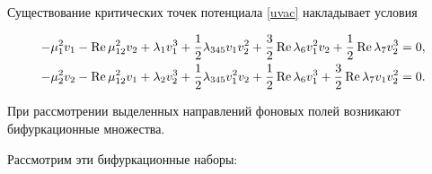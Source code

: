 Существование критических точек потенциала \eqref{uvac} накладывает условия

\begin{gather}

\label{dudv1}

-\mu_1^2 v_1- \mathop{\rm Re} \mu_{12}^2 v_2 + \lambda_1 v_1^3+\frac{1}{2} \lambda_{345} v_1 v_2^2+ \frac{3}{2}\mathop{\rm Re} \lambda_6 v_1^2 v_2+\frac{1}{2}\mathop{\rm Re} \lambda_7 v_2^3=0,\\

\label{dudv2}

-\mu_2^2 v_2- \mathop{\rm Re} \mu_{12}^2 v_1 + \lambda_2 v_2^3+\frac{1}{2} \lambda_{345} v_1^2 v_2+ \frac{1}{2}\mathop{\rm Re} \lambda_6 v_1^3+\frac{3}{2}\mathop{\rm Re} \lambda_7 v_1 v_2^2=0.

\end{gather}







При рассмотрении выделенных направлений фоновых полей возникают бифуркационные множества.

Рассмотрим эти бифуркационные наборы:



